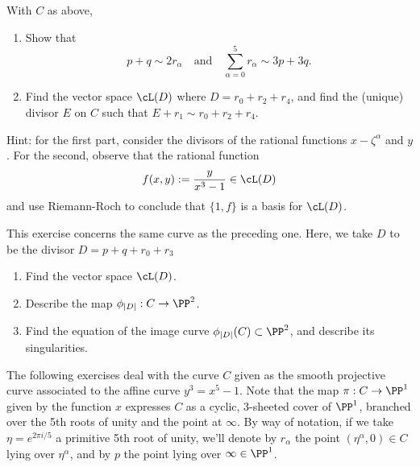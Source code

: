 \begin{exercise} With $C$ as above,
\begin{enumerate}
\item Show that
$$
p+q \sim 2r_\alpha \quad \text{and} \quad \sum_{\alpha = 0}^5 r_\alpha \sim 3p+3q.
$$
\item Find the vector space $\cL(D)$ where $D = r_0 + r_2 + r_4$, and find the (unique) divisor $E$ on $C$ such that $E + r_1 \sim r_0 + r_2 + r_4$.
\end{enumerate}
\end{exercise}

Hint: for the first part, consider the divisors of the rational functions $x-\zeta^\alpha$ and $y$. For the second, observe that the rational function 
$$
f(x,y) := \frac{y}{x^3-1} \in \cL(D)
$$
 and use Riemann-Roch to conclude that $\{1,f\}$ is a basis for $\cL(D)$.

\begin{exercise}
This exercise concerns the same curve as the preceding one. Here, we take $D$ to be the divisor $D = p + q + r_0 + r_3$
\begin{enumerate}
\item Find the vector space $\cL(D)$.
\item Describe the map $\phi_{|D|} : C \to \PP^2$.
\item Find the equation of the image curve $\phi_{|D|}(C) \subset \PP^2$, and describe its singularities.
\end{enumerate}
\end{exercise}

The following exercises deal with the curve $C$ given as the smooth projective curve associated to the affine curve $y^3 = x^5 -1$. Note that the map $\pi : C \to \PP^1$ given by the function $x$ expresses $C$ as a cyclic, 3-sheeted cover of $\PP^1$, branched over the 5th roots of unity and the point at $\infty$. By way of notation, if we take $\eta = e^{2\pi i/5}$ a primitive 5th root of unity, we'll denote by $r_\alpha$ the point $(\eta^\alpha, 0) \in C$ lying over $\eta^\alpha$, and by $p$ the point lying over $\infty \in \PP^1$.

